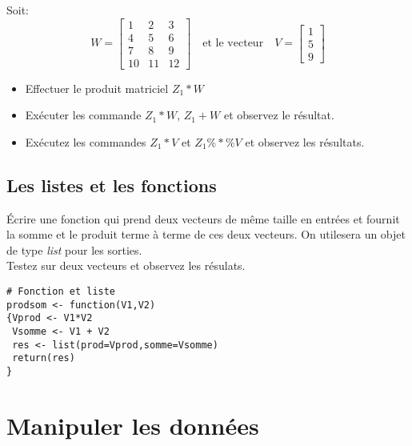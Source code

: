 \documentclass[12pt,twoside,openright]{article}
\begin{document}
Soit:
$$
W=\left[\begin{array}{ccc}
1 & 2 & 3\\
4 & 5 & 6 \\
7 & 8 & 9 \\
10 & 11 & 12
\end{array}\right] \quad \mbox{et le vecteur} \quad V=\left[\begin{array}{c}
1 \\
5  \\
9  
\end{array}\right]
$$
\begin{itemize} 
\item Effectuer le produit matriciel $Z_1*W$
\item Exécuter les commande $Z_1*W$,   $Z_1+W$ et observez le résultat.
\item Exécutez les commandes $Z_1*V$ et $Z_1\%*\%V$ et observez les résultats.
\end{itemize}
\subsection{Les listes et les fonctions}
\'Ecrire une fonction qui prend deux vecteurs de même taille en entrées et fournit la somme et le produit terme à terme de ces deux vecteurs. On utilesera un objet de type \emph{list} pour les sorties. \\

Testez sur deux vecteurs et observez les résulats.
%
\begin{verbatim}
# Fonction et liste
prodsom <- function(V1,V2)
{Vprod <- V1*V2
 Vsomme <- V1 + V2
 res <- list(prod=Vprod,somme=Vsomme)
 return(res)
}

\end{verbatim}
%
\section {Manipuler les données}
%
\end{document}
